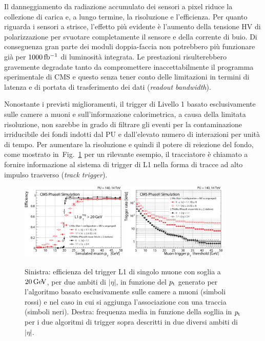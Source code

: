 Il danneggiamento da radiazione accumulato dei sensori a pixel riduce la collezione di carica e, a lungo termine, la risoluzione e l'efficienza. 
Per quanto riguarda i sensori a strisce, l'effetto pi\`u evidente \`e l'aumento della tensione HV di polarizzazione per svuotare completamente il sensore e della corrente di buio. Di conseguenza gran parte dei moduli doppia-faccia non potrebbero pi\`u funzionare gi\`a per $1000{\rm \, fb^{-1}}$ di luminosit\`a integrata. Le prestazioni risulterebbero gravemente degradate tanto da compromettere inaccettabilmente il programma sperimentale di CMS e questo senza tener conto delle limitazioni in termini di latenza e di portata di trasferimento dei dati ({\em readout bandwidth}).

Nonostante i previsti miglioramenti, il trigger di Livello 1 basato esclusivamente sulle camere a muoni e sull'informazione calorimetrica, a causa della limitata risoluzione, non sarebbe in grado di filtrare gli eventi per la contaminazione irriducibile dei fondi indotti dal PU e dall'elevato numero di interazioni per unit\`a di tempo. Per aumentare la risoluzione e quindi il potere di reiezione del fondo, come mostrato in~Fig.~\ref{fig:CMSTkL1} per un rilevante esempio, il tracciatore \`e chiamato a fornire informazione al sistema di trigger di L1 nella forma di tracce ad alto impulso trasverso ({\em track trigger}).
\begin{figure}
\centering
\includegraphics[width=0.45\textwidth]{Immagini/CMSTkL1_res.PNG}
\hfill
\includegraphics[width=0.45\textwidth]{Immagini/CMSTkL1_rate.PNG}
\caption{Sinistra: efficienza del trigger L1 di singolo muone con soglia a $20{\rm \, Ge\kern-0.125em V}$, per due ambiti di $|\eta|$, in funzione del ${p_{\rm t}}$ generato per l'algoritmo basato esclusivamente sulle camere a muoni (simboli rossi) e nel caso in cui si aggiunga l'associazione con una traccia (simboli neri). Destra: frequenza media in funzione della sogllia in ${p_{\rm t}}$ per i due algoritmi di trigger sopra descritti in due diversi ambiti di $|\eta|$.}
\label{fig:CMSTkL1}
\end{figure}

